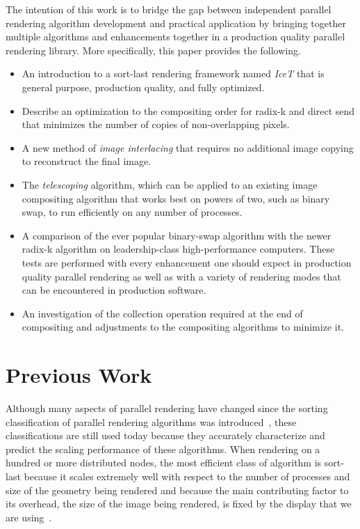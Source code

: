 \documentclass{vgtc}                          %
\newcommand*{\lcite}[1]{~\cite{#1}}
\newcommand*{\keyterm}[1]{\emph{#1}}
\begin{document}
The intention of this work is to bridge the gap between independent
parallel rendering algorithm development and practical application by
bringing together multiple algorithms and enhancements together in a
production quality parallel rendering library.  More specifically, this
paper provides the following.

\begin{itemize}
\item An introduction to a sort-last rendering framework named
  \keyterm{IceT} that is general purpose, production quality, and fully
  optimized.
\item Describe an optimization to the compositing order for radix-k and
  direct send that minimizes the number of copies of non-overlapping
  pixels.
\item A new method of \keyterm{image interlacing} that requires no
  additional image copying to reconstruct the final image.
\item The \keyterm{telescoping} algorithm, which can be applied to an
  existing image compositing algorithm that works best on powers of two,
  such as binary swap, to run efficiently on any number of processes.
\item A comparison of the ever popular binary-swap algorithm with the newer
  radix-k algorithm on leadership-class high-performance computers.  These
  tests are performed with every enhancement one should expect in
  production quality parallel rendering as well as with a variety of
  rendering modes that can be encountered in production software.
\item An investigation of the collection operation required at the end of
  compositing and adjustments to the compositing algorithms to minimize
  it.
\end{itemize}

\section{Previous Work}
\label{sec:PreviousWork}

Although many aspects of parallel rendering have changed since the sorting
classification of parallel rendering algorithms was
introduced\lcite{Molnar1994}, these classifications are still used today
because they accurately characterize and predict the scaling performance of
these algorithms.  When rendering on a hundred or more distributed nodes,
the most efficient class of algorithm is sort-last because it scales
extremely well with respect to the number of processes and size of the
geometry being rendered and because the main contributing factor to its
overhead, the size of the image being rendered, is fixed by the display
that we are using\lcite{Wylie2001}.
\end{document}
